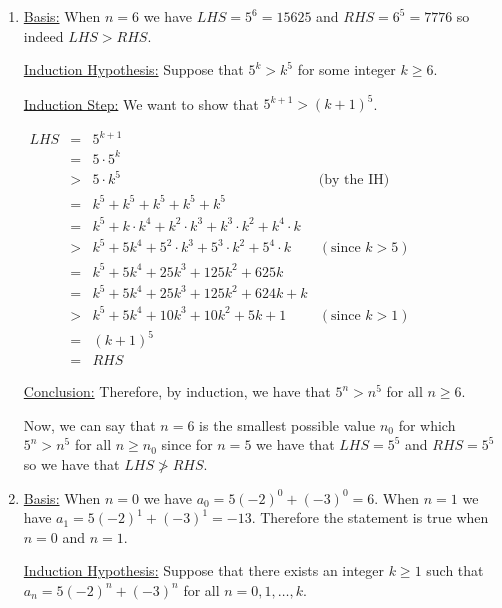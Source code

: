 \documentclass[11 pt]{article}%
\begin{document}
\begin{enumerate}
\begin{enumerate}
\end{enumerate}

\item
\underline{Basis:} When $n=6$ we have $LHS = 5^6 = 15625$ and $RHS = 6^5= 7776$ so indeed $LHS > RHS$.

\underline{Induction Hypothesis:} Suppose that $5^k > k^5$ for some integer $k\geq 6$. 

\underline{Induction Step:} We want to show that $5^{k+1} > (k+1)^5$.
\begin{center}
$\begin{array}{cclr}
LHS & = & 5^{k+1} & \\
 & = & 5 \cdot 5^k &\\
  & > & 5 \cdot k^5  &\mbox{(by the IH)} \\
  & = & k^5 + k^5 + k^5 + k^5 + k^5 & \\
  & = & k^5 + k\cdot k^4 + k^2\cdot k^3 + k^3 \cdot k^2 + k^4 \cdot k &\\
  & > & k^5 + 5 k^4 + 5^2 \cdot k^3 + 5^3 \cdot k^2 + 5^4 \cdot k & (\mbox{since } k>5)\\
  & = & k^5 + 5 k^4 + 25 k^3 +  125 k^2 + 625 k &\\
  & = & k^5 + 5 k^4 + 25 k^3 +  125 k^2 + 624 k + k &\\
  & > & k^5 + 5 k^4 + 10 k^3 + 10 k^2 + 5k + 1 & (\mbox{since } k>1) \\
  & = & (k+1)^5 &\\
  & = & RHS &
  \end{array}$
  \end{center}
  
\underline{Conclusion:} Therefore, by induction, we have that $5^n > n^5$ for all $n\geq 6$.

Now, we can say that $n=6$ is the smallest possible value $n_0$ for which $5^n > n^5$ for all $n\geq n_0$ since for $n=5$ we have that $LHS = 5^5$ and $RHS = 5^5$ so we have that $LHS \not> RHS$.



\item  
\underline{Basis:} When $n=0$ we have $a_0 = 5(-2)^0 + (-3)^0 = 6$. When $n=1$ we have $a_1 = 5(-2)^1 + (-3)^1 = -13$. Therefore the statement is true when $n=0$ and $n=1$.

\underline{Induction Hypothesis:} Suppose that there exists an integer $k\geq 1$ such that $a_n = 5(-2)^n + (-3)^n$ for all $n = 0, 1, \ldots, k$.


\end{enumerate}
\end{document}
